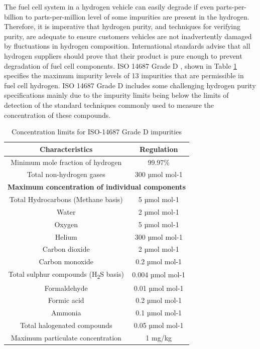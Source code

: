 The fuel cell system in a hydrogen vehicle can easily degrade if even parts-per-billion to parts-per-million level of some impurities are present in the hydrogen. Therefore, it is imperative that hydrogen purity, and techniques for verifying purity, are adequate to ensure customers vehicles are not inadvertently damaged by fluctuations in hydrogen composition. International standards advise that all hydrogen suppliers should prove that their product is pure enough to prevent degradation of fuel cell components. ISO 14687 Grade D \cite{InternationalStandardISO14687-2:20122012}, shown in Table \ref{tab:1} specifies the maximum impurity levels of 13 impurities that are permissible in fuel cell hydrogen. ISO 14687 Grade D includes some challenging hydrogen purity specifications mainly due to the impurity limits being below the limits of detection of the standard techniques commonly used to measure the concentration of these compounds. 

\begin{table}[]
    \caption{Concentration limits for ISO-14687 Grade D impurities}
    \centering
    \begin{tabular}{@{}cc@{}}
    \toprule
    \textbf{Characteristics}                  & \textbf{Regulation}    \\ \midrule
    Minimum mole fraction of hydrogen         & 99.97\%                \\
    Total non-hydrogen gases                  & 300 µmol mol-1         \\ \midrule
    \multicolumn{2}{c}{\textbf{Maximum concentration of individual components}} \\ \midrule
    Total Hydrocarbons (Methane basis)        & 5 µmol mol-1           \\
    Water                                     & 2 µmol mol-1           \\
    Oxygen                                    & 5 µmol mol-1           \\
    Helium                                    & 300 µmol mol-1         \\
    Carbon dioxide                            & 2 µmol mol-1           \\
    Carbon monoxide                           & 0.2 µmol mol-1         \\
    Total sulphur compounds (H\textsubscript{2}S basis)       & 0.004 µmol mol-1       \\
    Formaldehyde                              & 0.01 µmol mol-1        \\
    Formic acid                               & 0.2 µmol mol-1         \\
    Ammonia                                   & 0.1 µmol mol-1         \\
    Total halogenated compounds               & 0.05 µmol mol-1        \\
    Maximum particulate concentration         & 1 mg/kg                \\ \bottomrule
    \end{tabular}
    \label{tab:1}
\end{table}

